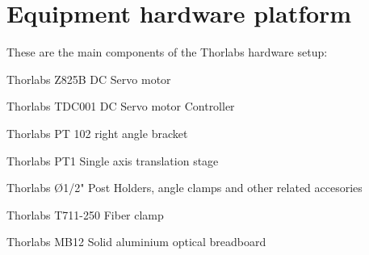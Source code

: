 \chapter{Equipment hardware platform} \label{cha:equipment}



These are the main components of the Thorlabs hardware setup:
\begin{compactitem}
\item Thorlabs Z825B DC Servo motor
\item Thorlabs TDC001 DC Servo motor Controller
\item Thorlabs PT 102 right angle bracket
\item Thorlabs PT1 Single axis translation stage
\item Thorlabs Ø1/2" Post Holders, angle clamps and other related accesories
\item Thorlabs T711-250 Fiber clamp
\item Thorlabs MB12 Solid aluminium optical breadboard
\end{compactitem}
